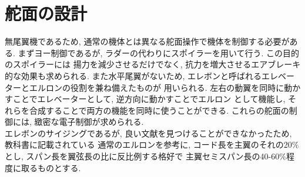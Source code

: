 \documentclass[class=article, crop=false, dvipdfmx, fleqn]{standalone}
\begin{document}
\section{舵面の設計}
無尾翼機であるため, 通常の機体とは異なる舵面操作で機体を制御する必要がある.
まずヨー制御であるが, ラダーの代わりにスポイラーを用いて行う. この目的のスポイラーには
揚力を減少させるだけでなく, 抗力を増大させるエアブレーキ的な効果も求められる.
また水平尾翼がないため, エレボンと呼ばれるエレベーターとエルロンの役割を兼ね備えたものが
用いられる. 左右の動翼を同時に動かすことでエレベーターとして, 逆方向に動かすことでエルロン
として機能し, それらを合成することで両方の機能を同時に使うことができる.
これらの舵面の制御には, 緻密な電子制御が求められる. \\
エレボンのサイジングであるが, 良い文献を見つけることができなかったため, 教科書に記載されている
通常のエルロンを参考に, コード長を主翼のそれの20$\%$とし, スパン長を翼弦長の比に反比例する格好で
主翼セミスパン長の40-60$\%$程度に取るものとする.
\end{document}
